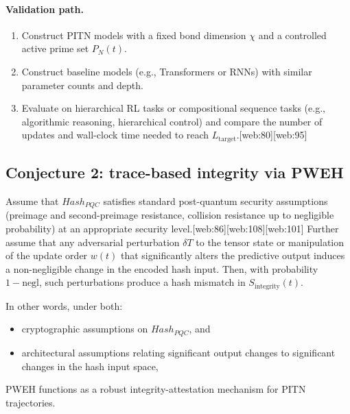 \documentclass[11pt]{article}
\begin{document}
\paragraph{Validation path.}
\begin{enumerate}[leftmargin=*]
  \item Construct PITN models with a fixed bond dimension \( \chi \) and a controlled active prime set \( P_N(t) \).
  \item Construct baseline models (e.g., Transformers or RNNs) with similar parameter counts and depth.
  \item Evaluate on hierarchical RL tasks or compositional sequence tasks (e.g., algorithmic reasoning, hierarchical control) and compare the number of updates and wall-clock time needed to reach \( L_{\text{target}} \).[web:80][web:95]
\end{enumerate}

\subsection{Conjecture 2: trace-based integrity via PWEH}

\begin{conjecture}
Assume that \( Hash_{PQC} \) satisfies standard post-quantum security assumptions (preimage and second-preimage resistance, collision resistance up to negligible probability) at an appropriate security level.[web:86][web:108][web:101] Further assume that any adversarial perturbation \( \delta T \) to the tensor state or manipulation of the update order \( w(t) \) that significantly alters the predictive output induces a non-negligible change in the encoded hash input. Then, with probability \( 1 - \text{negl} \), such perturbations produce a hash mismatch in \( S_{\text{integrity}}(t) \).
\end{conjecture}

In other words, under both:
\begin{itemize}[leftmargin=*]
  \item cryptographic assumptions on \( Hash_{PQC} \), and
  \item architectural assumptions relating significant output changes to significant changes in the hash input space,
\end{itemize}
PWEH functions as a robust integrity-attestation mechanism for PITN trajectories.
\end{document}
